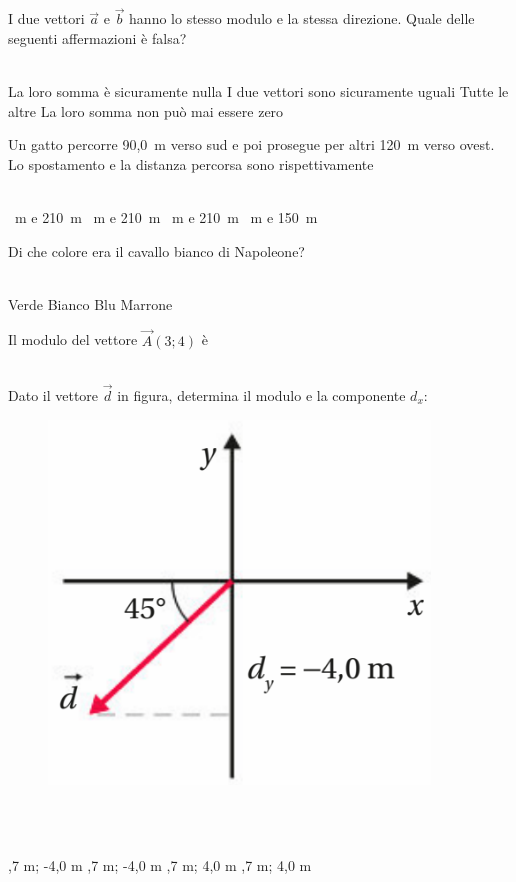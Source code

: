 \documentclass[a4paper,11pt]{exam}
\begin{document}
\begin{questions}
    
\question I due vettori $\vec{a}$ e $\vec{b}$ hanno lo stesso modulo e la stessa direzione. Quale delle seguenti affermazioni è falsa?\\\
\begin{oneparchoices}
  \choice La loro somma è sicuramente nulla
  \choice I due vettori sono sicuramente uguali
  \choice Tutte le altre
  \choice La loro somma non può mai essere zero
\end{oneparchoices}

    
\question Un gatto percorre 90,0~m verso sud e poi prosegue per altri 120~m verso ovest. Lo spostamento e la distanza percorsa sono rispettivamente\\\
\begin{oneparchoices}
  \choice 30~m e 210~m
  ~m e 210~m
  ~m e 210~m
  \choice 210~m e 150~m
\end{oneparchoices}

    
\question Di che colore era il cavallo bianco di Napoleone?\\\
\begin{oneparchoices}
  \choice Verde
  \choice Bianco
  \choice Blu 
  \choice Marrone
\end{oneparchoices}

    
\question Il modulo del vettore $\vec{A}(3;4)$ è\\\
\begin{oneparchoices}
  \choice 25
  \choice 8
  \choice 12
\end{oneparchoices}

    
\question Dato il vettore $\vec{d}$ in figura, determina il modulo e la componente $d_x$: \begin{figure}[h!]   \begin{center}     \includegraphics[scale=0.35]{vettored.png}   \end{center} \end{figure}\\\
\begin{oneparchoices}
  \choice 5,7 m; -4,0 m
  \choice -5,7 m; -4,0 m
  \choice 5,7 m; 4,0 m
  \choice -5,7 m; 4,0 m
\end{oneparchoices}


\end{questions}
\end{document}
